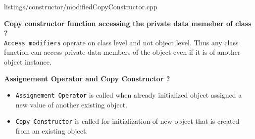 \documentclass[oops.tex]{subfiles}
\begin{document}
\begin{enumerate}
          
          {listings/constructor/modifiedCopyConstructor.cpp}

          {\bf Copy constructor function accessing the private data memeber of class ? }\\
          \texttt{Access modifiers} operate on class level and not object level. 
          Thus any class function can access private data members of the object 
          even if it is of another object instance.
          
          {\bf Assignement Operator and Copy Constructor ? }
          \begin{itemize}
            \item \texttt{Assignement Operator} is called when already initialized 
                  object assigned a new value of another existing object. 
            \item \texttt{Copy Constructor} is called for initialization of 
                  new object that is created from an existing object.
          \end{itemize}

\end{enumerate}
\end{document}
